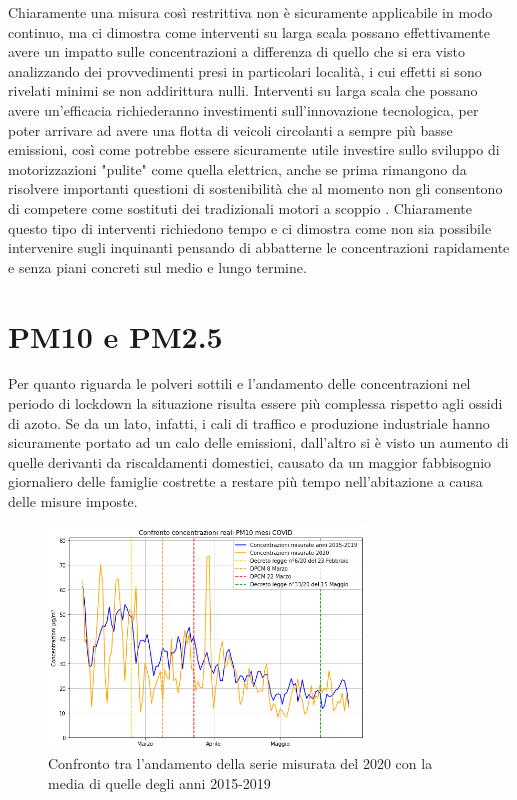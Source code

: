\documentclass[a4paper]{report}
\begin{document}
Chiaramente una misura così restrittiva non è sicuramente applicabile in modo continuo, ma ci dimostra come interventi su larga scala possano effettivamente avere un
 impatto sulle concentrazioni a differenza di quello che si era visto analizzando dei provvedimenti presi in particolari località, i cui effetti si sono rivelati minimi se non addirittura nulli.
Interventi su larga scala che possano avere un'efficacia richiederanno investimenti sull'innovazione tecnologica, per poter arrivare ad avere una flotta di veicoli circolanti a sempre più basse emissioni, così come potrebbe essere sicuramente utile investire sullo sviluppo di motorizzazioni "pulite" come quella elettrica, anche se prima rimangono da risolvere importanti questioni di sostenibilità che al momento non gli consentono di competere come sostituti dei tradizionali motori a scoppio \cite{skonhoft2014norwegian, jones2019if}.
Chiaramente questo tipo di interventi richiedono tempo
 e ci dimostra come non sia possibile intervenire sugli inquinanti pensando di abbatterne le concentrazioni rapidamente e senza piani concreti sul medio e lungo termine.

\section{PM10 e PM2.5}
Per quanto riguarda le polveri sottili e l'andamento delle concentrazioni nel periodo di lockdown la situazione risulta essere più complessa rispetto agli ossidi di azoto.
Se da un lato, infatti, i cali di traffico e produzione industriale hanno sicuramente portato ad un calo delle emissioni, dall'altro si è visto un aumento di quelle derivanti da riscaldamenti domestici, causato da un maggior fabbisognio giornaliero delle famiglie costrette a restare più tempo nell'abitazione a causa delle misure imposte. 

\begin{figure}[h]
\centering
\includegraphics[width=0.75\textwidth]{pm10_covid}
\caption{Confronto tra l'andamento della serie misurata del 2020 con la media di quelle degli anni 2015-2019}
\label{fig:pm10_covid}
\end{figure}
\end{document}
